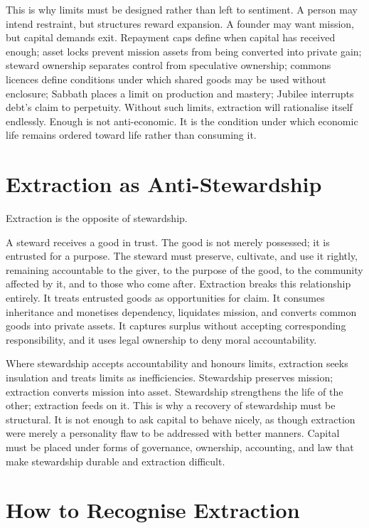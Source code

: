 \documentclass[11pt,a4paper,oneside]{book}
\begin{document}
This is why limits must be designed rather than left to sentiment. A person may intend restraint, but structures reward expansion. A founder may want mission, but capital demands exit. Repayment caps define when capital has received enough; asset locks prevent mission assets from being converted into private gain; steward ownership separates control from speculative ownership; commons licences define conditions under which shared goods may be used without enclosure; Sabbath places a limit on production and mastery; Jubilee interrupts debt's claim to perpetuity. Without such limits, extraction will rationalise itself endlessly. Enough is not anti-economic. It is the condition under which economic life remains ordered toward life rather than consuming it.

\section*{Extraction as Anti-Stewardship}

Extraction is the opposite of stewardship.

A steward receives a good in trust. The good is not merely possessed; it is entrusted for a purpose. The steward must preserve, cultivate, and use it rightly, remaining accountable to the giver, to the purpose of the good, to the community affected by it, and to those who come after. Extraction breaks this relationship entirely. It treats entrusted goods as opportunities for claim. It consumes inheritance and monetises dependency, liquidates mission, and converts common goods into private assets. It captures surplus without accepting corresponding responsibility, and it uses legal ownership to deny moral accountability.

Where stewardship accepts accountability and honours limits, extraction seeks insulation and treats limits as inefficiencies. Stewardship preserves mission; extraction converts mission into asset. Stewardship strengthens the life of the other; extraction feeds on it. This is why a recovery of stewardship must be structural. It is not enough to ask capital to behave nicely, as though extraction were merely a personality flaw to be addressed with better manners. Capital must be placed under forms of governance, ownership, accounting, and law that make stewardship durable and extraction difficult.

\section*{How to Recognise Extraction}
\end{document}
